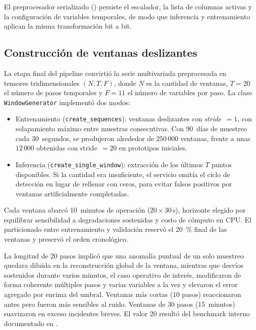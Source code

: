 El preprocesador serializado () persiste el escalador, la lista de columnas activas y la configuración de variables temporales, de modo que inferencia y entrenamiento aplican la misma transformación bit a bit.

\subsection{Construcción de ventanas deslizantes}

La etapa final del pipeline convirtió la serie multivariada preprocesada en tensores tridimensionales $(N, T, F)$, donde $N$ es la cantidad de ventanas, $T = 20$ el número de pasos temporales y $F = 11$ el número de variables por paso. La clase \texttt{WindowGenerator} implementó dos modos:

\begin{itemize}
\item Entrenamiento (\texttt{create\_sequences}): ventanas deslizantes con \textit{stride}~$= 1$, con solapamiento máximo entre muestras consecutivas. Con 90~días de muestreo cada 30~segundos, se produjeron alrededor de $250\,000$ ventanas, frente a unas $12\,000$ obtenidas con stride~$= 20$ en prototipos iniciales.
\item Inferencia (\texttt{create\_single\_window}): extracción de los últimos $T$ puntos disponibles. Si la cantidad era insuficiente, el servicio omitía el ciclo de detección en lugar de rellenar con ceros, para evitar falsos positivos por ventanas artificialmente completadas.
\end{itemize}

Cada ventana abarcó 10~minutos de operación ($20 \times 30\,\mathrm{s}$), horizonte elegido por equilibrar sensibilidad a degradaciones sostenidas y costo de cómputo en CPU. El particionado entre entrenamiento y validación reservó el 20~\% final de las ventanas y preservó el orden cronológico.

La longitud de 20 pasos implicó que una anomalía puntual de un solo muestreo quedara diluida en la reconstrucción global de la ventana, mientras que desvíos sostenidos durante varios minutos, el caso operativo de interés, modificaron de forma coherente múltiples pasos y varias variables a la vez y elevaron el error agregado por encima del umbral. Ventanas más cortas (10 pasos) reaccionaron antes pero fueron más sensibles al ruido. Ventanas de 30 pasos (15~minutos) suavizaron en exceso incidentes breves. El valor 20 resultó del benchmark interno documentado en .


